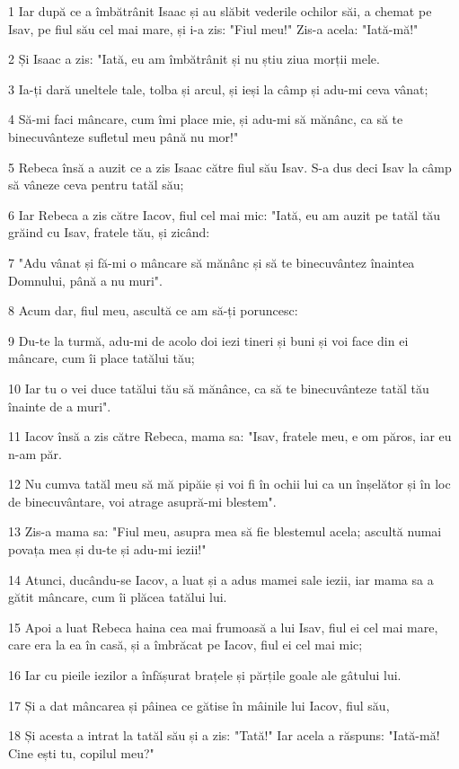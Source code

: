 \par 1 Iar după ce a îmbătrânit Isaac și au slăbit vederile ochilor săi, a chemat pe Isav, pe fiul său cel mai mare, și i-a zis: "Fiul meu!" Zis-a acela: "Iată-mă!"
\par 2 Și Isaac a zis: "Iată, eu am îmbătrânit și nu știu ziua morții mele.
\par 3 Ia-ți dară uneltele tale, tolba și arcul, și ieși la câmp și adu-mi ceva vânat;
\par 4 Să-mi faci mâncare, cum îmi place mie, și adu-mi să mănânc, ca să te binecuvânteze sufletul meu până nu mor!"
\par 5 Rebeca însă a auzit ce a zis Isaac către fiul său Isav. S-a dus deci Isav la câmp să vâneze ceva pentru tatăl său;
\par 6 Iar Rebeca a zis către Iacov, fiul cel mai mic: "Iată, eu am auzit pe tatăl tău grăind cu Isav, fratele tău, și zicând:
\par 7 "Adu vânat și fă-mi o mâncare să mănânc și să te binecuvântez înaintea Domnului, până a nu muri".
\par 8 Acum dar, fiul meu, ascultă ce am să-ți poruncesc:
\par 9 Du-te la turmă, adu-mi de acolo doi iezi tineri și buni și voi face din ei mâncare, cum îi place tatălui tău;
\par 10 Iar tu o vei duce tatălui tău să mănânce, ca să te binecuvânteze tatăl tău înainte de a muri".
\par 11 Iacov însă a zis către Rebeca, mama sa: "Isav, fratele meu, e om păros, iar eu n-am păr.
\par 12 Nu cumva tatăl meu să mă pipăie și voi fi în ochii lui ca un înșelător și în loc de binecuvântare, voi atrage asupră-mi blestem".
\par 13 Zis-a mama sa: "Fiul meu, asupra mea să fie blestemul acela; ascultă numai povața mea și du-te și adu-mi iezii!"
\par 14 Atunci, ducându-se Iacov, a luat și a adus mamei sale iezii, iar mama sa a gătit mâncare, cum îi plăcea tatălui lui.
\par 15 Apoi a luat Rebeca haina cea mai frumoasă a lui Isav, fiul ei cel mai mare, care era la ea în casă, și a îmbrăcat pe Iacov, fiul ei cel mai mic;
\par 16 Iar cu pieile iezilor a înfășurat brațele și părțile goale ale gâtului lui.
\par 17 Și a dat mâncarea și pâinea ce gătise în mâinile lui Iacov, fiul său,
\par 18 Și acesta a intrat la tatăl său și a zis: "Tată!" Iar acela a răspuns: "Iată-mă! Cine ești tu, copilul meu?"

